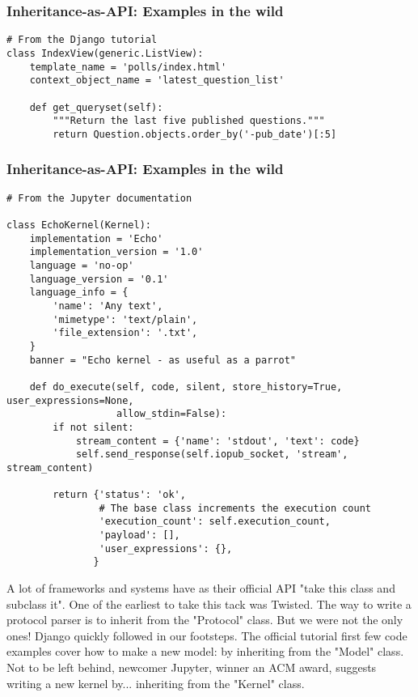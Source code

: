 \begin{frame}[fragile]
\frametitle{Inheritance-as-API: Examples in the wild}

\begin{lstlisting}
# From the Django tutorial
class IndexView(generic.ListView):
    template_name = 'polls/index.html'
    context_object_name = 'latest_question_list'

    def get_queryset(self):
        """Return the last five published questions."""
        return Question.objects.order_by('-pub_date')[:5]
\end{lstlisting}

\end{frame}

\begin{frame}[fragile]
\frametitle{Inheritance-as-API: Examples in the wild}

\begin{lstlisting}
# From the Jupyter documentation

class EchoKernel(Kernel):
    implementation = 'Echo'
    implementation_version = '1.0'
    language = 'no-op'
    language_version = '0.1'
    language_info = {
        'name': 'Any text',
        'mimetype': 'text/plain',
        'file_extension': '.txt',
    }
    banner = "Echo kernel - as useful as a parrot"

    def do_execute(self, code, silent, store_history=True, user_expressions=None,
                   allow_stdin=False):
        if not silent:
            stream_content = {'name': 'stdout', 'text': code}
            self.send_response(self.iopub_socket, 'stream', stream_content)

        return {'status': 'ok',
                # The base class increments the execution count
                'execution_count': self.execution_count,
                'payload': [],
                'user_expressions': {},
               }
\end{lstlisting}

\end{frame}

A lot of frameworks and systems have as their official API
"take this class and subclass it".
One of the earliest to take this tack was Twisted.
The way to write a protocol parser is to inherit from the
"Protocol"
class.
But we were not the only ones!
Django quickly followed in our footsteps.
The official tutorial first few code examples
cover how to make a new model:
by inheriting from the
"Model"
class.
Not to be left behind,
newcomer Jupyter,
winner an ACM award,
suggests writing a new kernel
by...
inheriting from the
"Kernel"
class.

